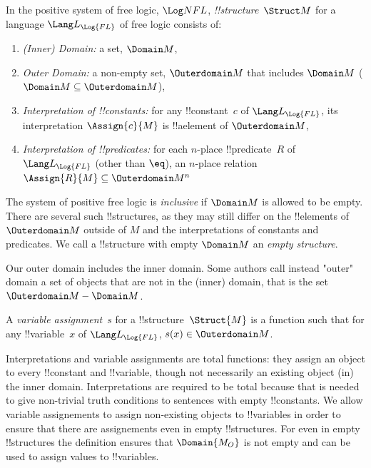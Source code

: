 \documentclass[../../../include/open-logic-section]{subfiles}
\begin{document}
\begin{defn}[!!^{structure}s]
In the positive system of free logic, $\Log NFL$,
 \emph{!!{structure}}~$\Struct M$ for a language
$\Lang L_{\Log{FL}}$ of free logic consists of:
\begin{enumerate}
\item \emph{(Inner) Domain:} a set, $\Domain M$,
\item \emph{Outer Domain:} a non-empty set, $\Outerdomain M$ that
	includes $\Domain M$ ($\Domain M \subseteq \Outerdomain M $),
\item \emph{Interpretation of !!{constant}s:} for any !!{constant}~$c$ of
  $\Lang L_{\Log{FL}}$, its interpretation $\Assign{c}{M}$ is !!a{element} of 
  $\Outerdomain M$,
\item \emph{Interpretation of !!{predicate}s:} for each $n$-place
  !!{predicate}~$R$ of $\Lang L_{\Log{FL}}$ (other than $\eq$), an $n$-place
  relation $\Assign{R}{M} \subseteq \Outerdomain M^n$
\end{enumerate}
The system of positive free logic is \emph{inclusive} if $\Domain M$ is
allowed to be empty. There are several such !!{structure}s, as they may
still differ on the !!{element}s of $\Outerdomain M$ outside of $M$ and the 
interpretations of constants and predicates. We call a !!{structure} with
empty $\Domain M$ an \emph{empty structure}. 
\end{defn}

\begin{intro}
Our outer domain includes the inner domain. Some authors call instead "outer" 
domain a set of objects that are not in the (inner) domain, that is the set
$\Outerdomain M - \Domain M$.  
\end{intro}

\begin{defn}
A \emph{variable assignment}~$s$ for a !!{structure}~$\Struct{M}$ is a
  function such that for any !!{variable}~$x$ of
  $\Lang L_{\Log{FL}}$, $s(x) \in \Outerdomain M$. 
\end{defn}

\begin{explain}
Interpretations and variable assignments are total functions: they 
assign an object to every !!{constant} and !!{variable}, though 
not necessarily an existing object (in) the inner domain. Interpretations
are required to be total because that is needed to give non-trivial
truth conditions to sentences with empty !!{constant}s. We allow
variable assignements to assign non-existing objects to !!{variable}s in
order to ensure that there are assignements even in empty
 !!{structure}s. For even in empty !!{structure}s the definition ensures 
 that $\Domain{M_O}$ is not empty and can be used to assign values to
 !!{variable}s.
\end{explain}
\end{document}
